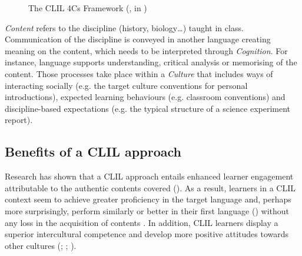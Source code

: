 \documentclass[output=paper]{langscibook}
\begin{document}
\begin{figure}
\caption{\label{fig:labeau:3}The CLIL 4Cs Framework (\citealt{Coyle2006}, in \citealt[551]{Coyle2007})}
\end{figure}

\textit{Content} refers to the discipline (history, biology…) taught in class. Communication of the discipline is conveyed in another language creating meaning on the content, which needs to be interpreted through \textit{Cognition}. For instance, language supports understanding, critical analysis or memorising of the content. Those processes take place within a \textit{Culture} that includes ways of interacting socially (e.g. the target culture conventions for personal introductions), expected learning behaviours (e.g. classroom conventions) and discipline-based expectations (e.g. the typical structure of a science experiment report).

\subsection{Benefits of a CLIL approach}\largerpage

Research has shown that a CLIL approach entails enhanced learner engagement attributable to the authentic contents covered (\citealt{CoyleEtAl2010, MehistoEtAl2008}). As a result, learners in a CLIL context seem to achieve greater proficiency in the target language \citep{Wesche2002} and, perhaps more surprisingly, perform similarly or better in their first language (\citealt{Alberta2010,Baker2006}) without any loss in the acquisition of contents \citep{Dalton-Puffer2008}. In addition, CLIL learners display a superior intercultural competence and develop more positive attitudes towards other cultures (\citealt{LasagabasterSierra2009}; \citealt{RodriguezPuyal2012}; \citealt{Sudhoff2010}).
\end{document}

